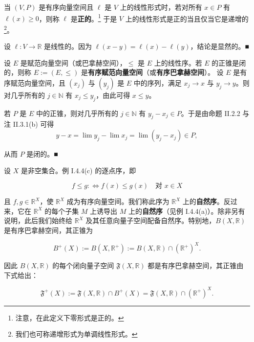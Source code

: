 \begin{remark}
\begin{items}
\begin{subitems}
\end{subitems}

\item

当 $ (V, P) $ 是有序向量空间且 $ \ell $ 是 $ V $ 上的线性形式时，若对所有 $ x \in P $ 有 $ \ell(x) \ge 0 $，则称 $ \ell $ 是\textbf{正的}。\footnote{注意，在此定义下零形式是正的。} 于是 $ V $ 上的线性形式是正的当且仅当它是递增的\footnote{我们也可称递增形式为单调线性形式。}。

\proofhead
设 $ \ell : V \to \mathbb{R} $ 是线性的。因为 $ \ell(x - y) = \ell(x) - \ell(y) $，结论是显然的。\nobreak\hspace{0.35em}■
\item

设 $ E $ 是赋范向量空间（或巴拿赫空间），$ \le $ 是 $ E $ 上的线性序。若 $ E $ 的正锥是闭的，则称 $ E := (E, \le) $ 是\textbf{有序赋范向量空间}（或\textbf{有序巴拿赫空间}）。
设 $ E $ 是有序赋范向量空间，且 $ (x_j) $ 与 $ (y_j) $ 是 $ E $ 中的序列，满足 $ x_j \to x $ 与 $ y_j \to y $。则对几乎所有的 $ j \in \mathbb{N} $ 有 $ x_j \le y_j $，由此可得 $ x \le y $。

\proofhead
若 $ P $ 是 $ E $ 中的正锥，则对几乎所有的 $ j \in \mathbb{N} $ 有 $ y_j - x_j \in P $。于是由命题 II.2.2 与注 II.3.1(b) 可得
\[
y - x = \lim y_j - \lim x_j = \lim(y_j - x_j) \in P ,
\]

从而 $ P $ 是闭的。\nobreak\hspace{0.35em}■

\item

设 $ X $ 是非空集合。例 I.4.4(c) 的逐点序，即

\[
f \le g :\Leftrightarrow f(x) \le g(x) \quad \text{对 } x \in X
\]

且 $ f, g \in \mathbb{R}^{X} $，使 $ \mathbb{R}^{X} $ 成为有序向量空间。我们称此序为 $ \mathbb{R}^{X} $ 上的\textbf{自然序}。反过来，它在 $ \mathbb{R}^{X} $ 的每个子集 $ M $ 上诱导出 $ M $ 上的\textbf{自然序}（见例 I.4.4(a)）。除非另有说明，此后我们始终给 $ \mathbb{R}^{X} $ 及其任意向量子空间配备自然序。特别地，$ B(X, \mathbb{R}) $ 是有序巴拿赫空间，其正锥为

\[
B^{+}(X) := B(X, \mathbb{R}^{+}) := B(X, \mathbb{R}) \cap (\mathbb{R}^{+})^{X} .
\]

因此 $ B(X, \mathbb{R}) $ 的每个闭向量子空间 $ \mathfrak{F}(X, \mathbb{R}) $ 都是有序巴拿赫空间，其正锥由下式给出：

\[
\mathfrak{F}^{+}(X) := \mathfrak{F}(X, \mathbb{R}) \cap B^{+}(X) = \mathfrak{F}(X, \mathbb{R}) \cap (\mathbb{R}^{+})^{X} .
\]


\end{items}
\end{remark}
